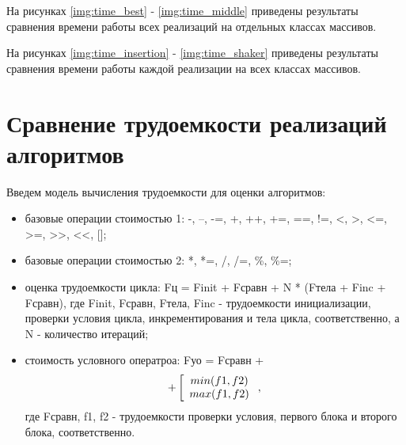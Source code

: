 


На рисунках \ref{img:time_best} - \ref{img:time_middle} приведены результаты сравнения времени работы всех реализаций на отдельных классах массивов.






На рисунках \ref{img:time_insertion} - \ref{img:time_shaker} приведены результаты сравнения времени работы каждой реализации на всех классах массивов.






\section{Сравнение трудоемкости реализаций алгоритмов}

Введем модель вычисления трудоемкости для оценки алгоритмов: 
\begin{itemize}
	\item базовые операции стоимостью 1: -, --, -=, +, ++, +=, ==, !=, <, >, <=, >=, >>, <<, [];
	\item базовые операции стоимостью 2: *, *=, /, /=, \%, \%=;
	\item оценка трудоемкости цикла: Fц = Finit + Fсравн + N * (Fтела + Finc + Fсравн), где Finit, Fсравн, Fтела, Finc - трудоемкости инициализации,  проверки условия цикла, инкрементирования и тела цикла, соответственно, а N - количество итераций;
	\item стоимость условного оператроа: Fуо = Fсравн + 
	\begin{equation}
		+
		\left[ 
		\begin{array}{c} 
			min(f1, f2) \\
			max(f1, f2)\\
		\end{array}
		\right.,\\
	\end{equation}где Fсравн, f1, f2 - трудоемкости проверки условия, первого блока и второго блока, соответственно.
	
\end{itemize}

